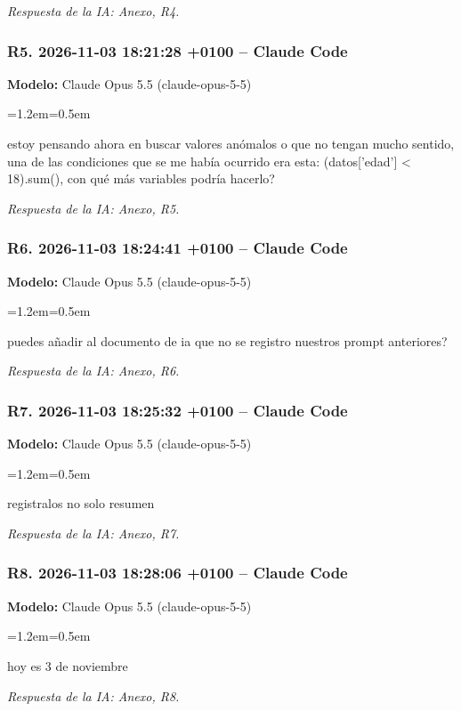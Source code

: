 \documentclass[11pt,a4paper]{article}
\newenvironment{prompt}
  {\par\smallskip\begin{list}{}{\leftmargin=1.2em\rightmargin=0.5em}\item\relax\small\color{black!80}}
  {\end{list}\smallskip}
\begin{document}
\textit{Respuesta de la IA: Anexo, R4.}

\subsubsection*{R5. 2026-11-03 18:21:28 +0100 -- Claude Code}
\textbf{Modelo:} Claude Opus 5.5 (claude-opus-5-5)

\begin{prompt}
estoy pensando ahora en buscar valores anómalos o que no tengan mucho sentido, una de las condiciones que se me había ocurrido era esta: (datos['edad'] \textless{} 18).sum(), con qué más variables podría hacerlo?
\end{prompt}

\textit{Respuesta de la IA: Anexo, R5.}

\subsubsection*{R6. 2026-11-03 18:24:41 +0100 -- Claude Code}
\textbf{Modelo:} Claude Opus 5.5 (claude-opus-5-5)

\begin{prompt}
puedes añadir al documento de ia que no se registro nuestros prompt anteriores?
\end{prompt}

\textit{Respuesta de la IA: Anexo, R6.}

\subsubsection*{R7. 2026-11-03 18:25:32 +0100 -- Claude Code}
\textbf{Modelo:} Claude Opus 5.5 (claude-opus-5-5)

\begin{prompt}
registralos no solo resumen
\end{prompt}

\textit{Respuesta de la IA: Anexo, R7.}

\subsubsection*{R8. 2026-11-03 18:28:06 +0100 -- Claude Code}
\textbf{Modelo:} Claude Opus 5.5 (claude-opus-5-5)

\begin{prompt}
hoy es 3 de noviembre
\end{prompt}

\textit{Respuesta de la IA: Anexo, R8.}
\end{document}
